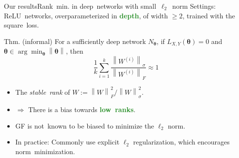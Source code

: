 \documentclass[handout,usenames,dvipsnames]{beamer} %
\newcommand{\norm}[2][]{{\left\|{#2}\right\|_{#1}}}
\newcommand{\btheta}{{\boldsymbol{\theta}}}
\newcommand{\true}[1]{{\textcolor{ForestGreen}{\textbf{#1}}}}
\begin{document}
\begin{frame}{Our results}{Rank~min. in deep~networks with small~$\ell_2$~norm}
    \pause
    Settings: ReLU~networks, overparameterized in \true{depth}, of width $\ge 2$, trained with the square~loss.
    \pause
    \begin{exampleblock}{Thm. (informal)}
        For a sufficiently deep network $N_\btheta$, if $L_{X,Y}(\btheta) = 0$ and $\btheta \in \arg\min_{\btheta} \norm{\btheta}$, then 
        \[
        \frac{1}{k}\sum_{i=1}^{k} \frac{\norm{W^{(i)}}_\sigma}{\norm{W^{(i)}}_F}
        \approx 1
        \]
    \end{exampleblock}
    \pause
    \begin{itemize}
        \item The \emph{stable~rank} of $W := {\norm{W}^2_F} / {\norm{W}^2_\sigma}$.
        \pause
        \item $\Rightarrow$ There is a bias towards \true{low~ranks}.
        \pause
        \item GF is \alert{not}~known to be biased to minimize the $\ell_2$ norm.
        \pause
        \item In practice: Commonly use explicit $\ell_2$ regularization, which encourages norm~minimization.
    \end{itemize}
    

\end{frame}
\end{document}
